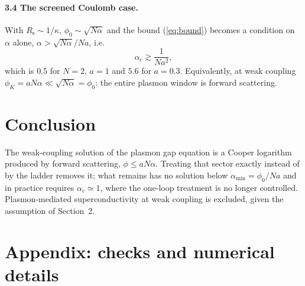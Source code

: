 \documentclass[11pt]{article}
\newcommand{\Rs}{R_{\mathrm s}}
\begin{document}
\paragraph{3.4 The screened Coulomb case.}
With $\Rs\sim1/\kappa$, $\phi_0\sim\sqrt{N\alpha}$ and the bound (\ref{eq:bound}) becomes a
condition on $\alpha$ alone, $\alpha>\sqrt{N\alpha}/Na$, i.e.
\begin{equation}
\alpha_c\gtrsim\frac{1}{Na^2},
\end{equation}
which is $0.5$ for $N=2$, $a=1$ and $5.6$ for $a=0.3$. Equivalently, at weak coupling
$\phi_K=aN\alpha\ll\sqrt{N\alpha}=\phi_0$: the entire plasmon window is forward scattering.

\section*{Conclusion}
The weak-coupling solution of the plasmon gap equation is a Cooper logarithm produced by
forward scattering, $\phi\le aN\alpha$. Treating that sector exactly instead of by the ladder
removes it; what remains has no solution below $\alpha_{\min}=\phi_0/Na$ and in practice
requires $\alpha_c\simeq1$, where the one-loop treatment is no longer controlled.
Plasmon-mediated superconductivity at weak coupling is excluded, given the assumption of
Section~2.

\appendix
\section*{Appendix: checks and numerical details}
\end{document}
